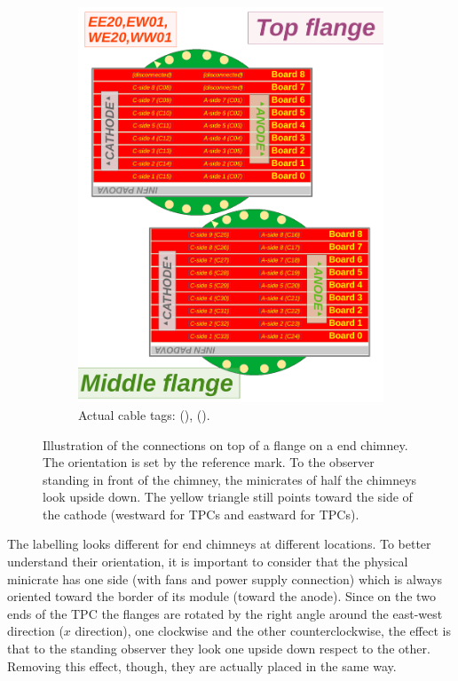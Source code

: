 \begin{figure}
\begin{subfigure}{0.50\linewidth}
    \includegraphics[width=\textwidth]{figures/CornerFlangesAndMinicrate_downward}
    \caption{Actual cable tags:  (),  ().}
    \label{fig:FlangeConnectionsCorner_downward}
  \end{subfigure}
  \caption{
    Illustration of the connections on top of a flange on a end chimney.
    The orientation is set by the reference mark.
    To the observer standing in front of the chimney,
    the minicrates of half the chimneys look upside down.
    The yellow triangle still points toward the side of the cathode
    (\ie westward for  TPCs and eastward for  TPCs).
  }
  \label{fig:FlangeConnectionsCorner}
\end{figure}

The labelling looks different for end chimneys at different locations.
To better understand their orientation,
it is important to consider that the physical minicrate has one side
(with fans and power supply connection) which is always oriented toward the border of its module (\ie toward the anode).
Since on the two ends of the TPC the flanges are rotated by the right angle around the east-west direction ($x$ direction),
one clockwise and the other counterclockwise,
the effect is that to the standing observer they look one upside down respect to the other.
Removing this effect, though, they are actually placed in the same way.



